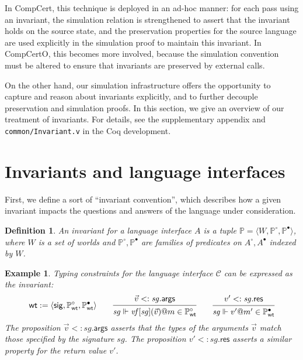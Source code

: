 \documentclass[draft,11pt]{report}
\newtheorem{definition}{Definition}
\newtheorem{example}{Example}
\newcommand{\kw}[1]{\ensuremath{ \mathsf{#1} }}
\newcommand{\que}{\circ}         %
\newcommand{\ans}{\bullet}       %
\begin{document}
In CompCert,
this technique is deployed in an ad-hoc manner:
for each pass using an invariant,
the simulation relation is strengthened to assert that
the invariant holds on the source state,
and the preservation properties for the source language
are used explicitly in the simulation proof
to maintain this invariant.
In CompCertO,
this becomes more involved,
because the simulation convention must be altered
to ensure that invariants are preserved
by external calls.

On the other hand,
our simulation infrastructure offers the opportunity
to capture and reason about invariants explicitly,
and to further decouple preservation and simulation proofs.
In this section,
we give an overview of our treatment of invariants.
For details,
see the supplementary appendix and
\texttt{common/Invariant.v}
in the Coq development.


\section{Invariants and language interfaces} %

First, we define a sort of ``invariant convention'',
which describes how a given invariant impacts the questions and answers
of the language under consideration.

\begin{definition} %
An \emph{invariant for a language interface} $A$
is a tuple
$\mathbb{P} = \langle W, \mathbb{P}^\que, \mathbb{P}^\ans \rangle$,
where $W$ is a set of worlds
and $\mathbb{P}^\que, \mathbb{P}^\ans$
are families of predicates on $A^\que, A^\ans$
indexed by $W$.
\end{definition}

\begin{example} \label{ex:wt} %
Typing constraints for the language interface $\mathcal{C}$
can be expressed as the invariant:
\[
  \kw{wt} :=
    \langle
      \kw{sig},
      \mathbb{P}_\kw{wt}^\que,
      \mathbb{P}_\kw{wt}^\ans
    \rangle
  \qquad
  \begin{prooftree}
    \hypo{\vec{v} <: \mathit{sg}.\kw{args}}
    \infer1{\mathit{sg} \Vdash
      \mathit{vf}[\mathit{sg}](\vec{v})@m \in \mathbb{P}_\kw{wt}^\que}
  \end{prooftree}
  \qquad
  \begin{prooftree}
    \hypo{v' <: \mathit{sg}.\kw{res}}
    \infer1{\mathit{sg} \Vdash
      v'@m' \in \mathbb{P}_\kw{wt}^\ans}
  \end{prooftree}
\]
The proposition $\vec{v} <: \mathit{sg}.\kw{args}$
asserts that the types of the arguments $\vec{v}$
match those specified by the signature $\mathit{sg}$.
The proposition $v' <: \mathit{sg}.\kw{res}$
asserts a similar property for the return value $v'$.
\end{example}
\end{document}
